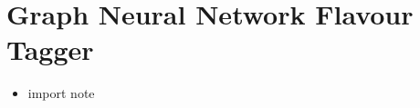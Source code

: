\chapter{Graph Neural Network Flavour Tagger}\label{chap:gnn_tagger}

\begin{itemize}
    \item import note
\end{itemize}

